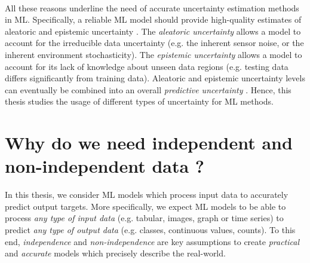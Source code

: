 \paragraph*{} All these reasons underline the need of accurate uncertainty estimation methods in ML. 
Specifically, a reliable ML model should provide high-quality estimates of aleatoric and epistemic uncertainty \citep{uncertainty-deep-learning}.
The \emph{aleatoric uncertainty} allows a model to account for the irreducible data uncertainty (e.g. the inherent sensor noise, or the inherent environment stochasticity).
The \emph{epistemic uncertainty} allows a model to account for its lack of knowledge about unseen data regions (e.g. testing data differs significantly from training data).
Aleatoric and epistemic uncertainty levels can eventually be combined into an overall \emph{predictive uncertainty} \citep{uncertainty-deep-learning}. Hence, this thesis studies the usage of different types of uncertainty for ML methods.


\section{Why do we need independent and non-independent data ?}

In this thesis, we consider ML models which process input data to accurately predict output targets. 
More specifically, we expect ML models to be able to process \emph{any type of input data} (e.g. tabular, images, graph or time series) to predict \emph{any type of output data} (e.g. classes, continuous values, counts).
To this end, \emph{independence} and \emph{non-independence} are key assumptions to create \emph{practical} and \emph{accurate} models which precisely describe the real-world. 


